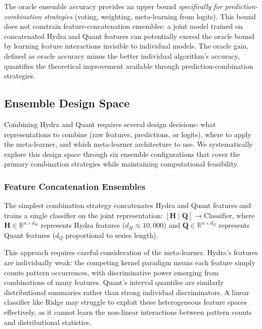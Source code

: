 \documentclass[pdflatex,sn-basic]{sn-jnl}           %
\theoremstyle{thmstyleone}%
\theoremstyle{thmstyletwo}%
\theoremstyle{thmstylethree}%
\begin{document}
The oracle ensemble accuracy provides an upper bound \textit{specifically for prediction-combination strategies} (voting, weighting, meta-learning from logits). This bound does not constrain feature-concatenation ensembles: a joint model trained on concatenated Hydra and Quant features can potentially exceed the oracle bound by learning feature interactions invisible to individual models. The oracle gain, defined as oracle accuracy minus the better individual algorithm's accuracy, quantifies the theoretical improvement available through prediction-combination strategies.

\subsection{Ensemble Design Space}\label{subsec:design_space}

Combining Hydra and Quant requires several design decisions: what representations to combine (raw features, predictions, or logits), where to apply the meta-learner, and which meta-learner architecture to use. We systematically explore this design space through six ensemble configurations that cover the primary combination strategies while maintaining computational feasibility.

\subsubsection{Feature Concatenation Ensembles}

The simplest combination strategy concatenates Hydra and Quant features and trains a single classifier on the joint representation: $[\mathbf{H} \mid \mathbf{Q}] \rightarrow \text{Classifier}$, where $\mathbf{H} \in \mathbb{R}^{n \times d_H}$ represents Hydra features ($d_H \approx 10{,}000$) and $\mathbf{Q} \in \mathbb{R}^{n \times d_Q}$ represents Quant features ($d_Q$ proportional to series length).

This approach requires careful consideration of the meta-learner. Hydra's features are individually weak: the competing kernel paradigm means each feature simply counts pattern occurrences, with discriminative power emerging from combinations of many features. Quant's interval quantiles are similarly distributional summaries rather than strong individual discriminators. A linear classifier like Ridge may struggle to exploit these heterogeneous feature spaces effectively, as it cannot learn the non-linear interactions between pattern counts and distributional statistics.
\end{document}
